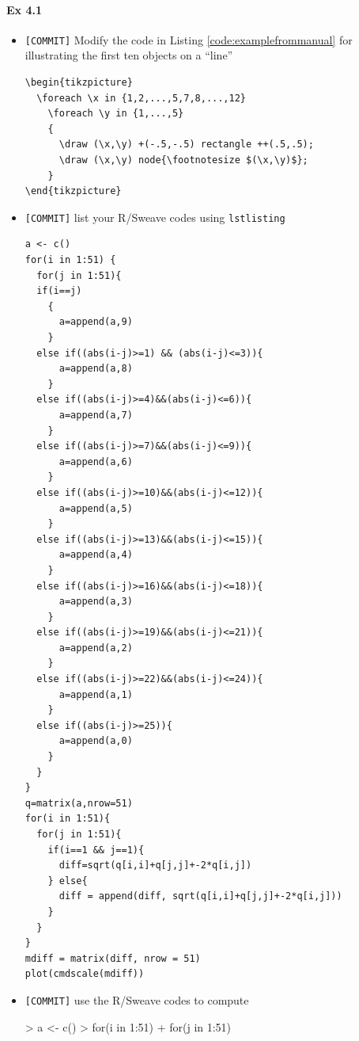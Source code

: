 \documentclass[12pt]{article}
\begin{document}
\paragraph{Ex 4.1}
\begin{itemize}
    \item \verb+[COMMIT]+ Modify the code in Listing \ref{code:examplefrommanual} for
        illustrating the first ten objects on a ``line''
\begin{center}
\begin{minipage}{0.65\textwidth}
\begin{lstlisting}[caption={TikZ Code for Figure
    \ref{fig:examplefrommanual}},label={code:examplefrommanual}]
\begin{tikzpicture}
  \foreach \x in {1,2,...,5,7,8,...,12}
    \foreach \y in {1,...,5}
    {
      \draw (\x,\y) +(-.5,-.5) rectangle ++(.5,.5);
      \draw (\x,\y) node{\footnotesize $(\x,\y)$};
    }
\end{tikzpicture}
\end{lstlisting}
\end{minipage}
\end{center}
    \item \verb+[COMMIT]+ list your R/Sweave codes using \verb+lstlisting+
\begin{lstlisting}
a <- c()
for(i in 1:51) {
  for(j in 1:51){
  if(i==j)
    {
      a=append(a,9)
    } 
  else if((abs(i-j)>=1) && (abs(i-j)<=3)){
      a=append(a,8)
    } 
  else if((abs(i-j)>=4)&&(abs(i-j)<=6)){
      a=append(a,7)  
    } 
  else if((abs(i-j)>=7)&&(abs(i-j)<=9)){
      a=append(a,6)
    } 
  else if((abs(i-j)>=10)&&(abs(i-j)<=12)){
      a=append(a,5)
    } 
  else if((abs(i-j)>=13)&&(abs(i-j)<=15)){
      a=append(a,4)
    } 
  else if((abs(i-j)>=16)&&(abs(i-j)<=18)){
      a=append(a,3)
    } 
  else if((abs(i-j)>=19)&&(abs(i-j)<=21)){
      a=append(a,2)
    } 
  else if((abs(i-j)>=22)&&(abs(i-j)<=24)){
      a=append(a,1)
    } 
  else if((abs(i-j)>=25)){
      a=append(a,0)
    } 
  }
}
q=matrix(a,nrow=51)
for(i in 1:51){
  for(j in 1:51){
    if(i==1 && j==1){
      diff=sqrt(q[i,i]+q[j,j]+-2*q[i,j])
    } else{
      diff = append(diff, sqrt(q[i,i]+q[j,j]+-2*q[i,j]))
    }
  }
}
mdiff = matrix(diff, nrow = 51)
plot(cmdscale(mdiff))
\end{lstlisting}
    \item \verb+[COMMIT]+ use the R/Sweave codes to compute
\begin{Schunk}
\begin{Sinput}
> a <- c()
> for(i in 1:51) {
+   for(j in 1:51){
}}
\end{Sinput}
\end{Schunk}
\end{itemize}
\end{document}
